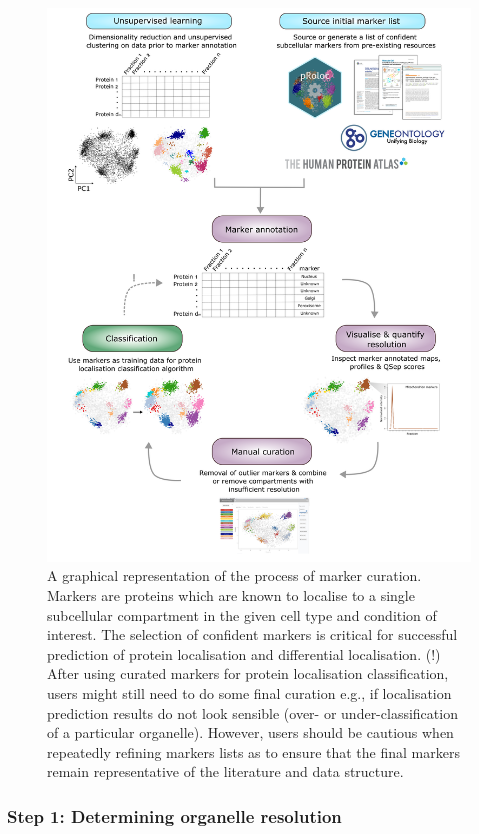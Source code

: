 \documentclass[9pt,a4paper,]{extarticle}
\begin{document}
\begin{figure}[H]

{\centering \includegraphics[width=0.9\linewidth,]{figs/marker_curation} 

}

\caption{A graphical representation of the process of marker curation. Markers are proteins which are known to localise to a single subcellular compartment in the given cell type and condition of interest. The selection of confident markers is critical for successful prediction of protein localisation and differential localisation. (!) After using curated markers for protein localisation classification, users might still need to do some final curation e.g., if localisation prediction results do not look sensible (over- or under-classification of a particular organelle). However, users should be cautious when repeatedly refining markers lists as to ensure that the final markers remain representative of the literature and data structure.}\label{fig:marker-curation}
\end{figure}

\subsubsection{Step 1: Determining organelle resolution}\label{step-1-determining-organelle-resolution}
\end{document}
